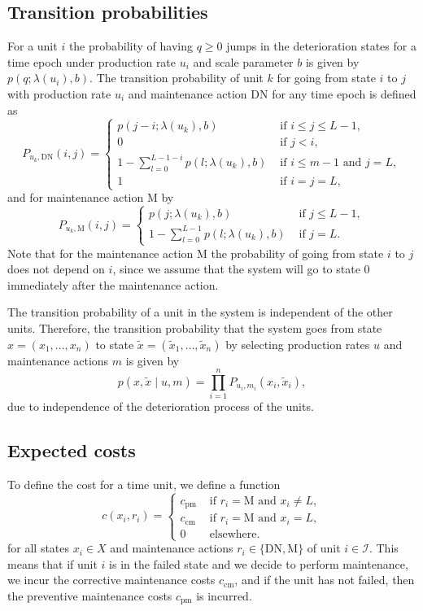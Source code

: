 \documentclass[a4paper,12pt]{article}
\begin{document}
\subsection{Transition probabilities}
For a unit $i$ the probability of having $q \geq 0$ jumps in the deterioration states for a time epoch under production rate $u_i$ and scale parameter $b$ is given by $p(q; \lambda(u_i), b)$. The transition probability of unit $k$ for going from state $i$ to $j$ with production rate $u_i$ and maintenance action DN for any time epoch is defined as
$$
P_{u_k,\text{DN}}(i,j) = \begin{cases}
p(j-i; \lambda(u_k), b) &\text{ if } i \leq j \leq L-1, \\
0 &\text{ if } j < i, \\
1 - \sum_{l=0}^{L-1-i}p(l; \lambda(u_k), b) & \text{ if } i \leq m-1  \text{ and } j = L, \\
1 & \text{ if } i = j = L,
\end{cases}
$$
and for maintenance action M by
$$
P_{u_k,\text{M}}(i,j) = \begin{cases}
p(j; \lambda(u_k), b)&\text{ if } j \leq  L-1, \\
1 - \sum_{l=0}^{L-1}p(l; \lambda(u_k), b) & \text{ if } j = L.
\end{cases}
$$
Note that for the maintenance action M the probability of going from state $i$ to $j$ does not depend on $i$, since we assume that the system will go to state 0 immediately after the maintenance action.

The transition probability of a unit in the system is independent of the other units. Therefore, the transition probability that the system goes from state $x = (x_1, \dots, x_n)$ to state $\tilde{x} = (\tilde{x}_1, \dots, \tilde{x}_n)$ by selecting production rates $u$ and maintenance actions $m$ is given by
$$
p(x, \tilde{x} \mid u, m) = \prod_{i = 1}^nP_{u_i,m_i}(x_i, \tilde{x}_i),
$$
due to independence of the deterioration process of the units.



\subsection{Expected costs}
To define the cost for a time unit, we define a function
$$
c(x_i,r_i) = \begin{cases}
c_{\text{pm}} & \text{ if } r_i = \text{M} \text{ and } x_i \neq L, \\
c_{\text{cm}} & \text{ if } r_i = \text{M} \text{ and } x_i = L, \\
0 & \text{ elsewhere}.
\end{cases}
$$
for all states $x_i \in X$ and maintenance actions $r_i \in \{\text{DN}, \text{M}\}$ of unit $i \in \mathcal{I}$. This means that if unit $i$ is in the failed state and we decide to perform maintenance, we incur the corrective maintenance costs $c_{\text{cm}}$, and if the unit has not failed, then the preventive maintenance costs $c_{\text{pm}}$ is incurred. 
\end{document}

